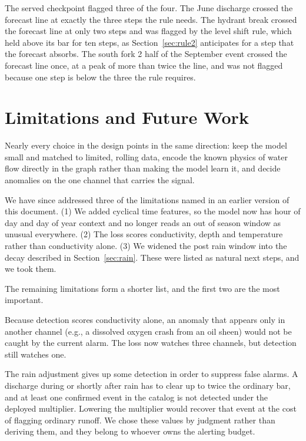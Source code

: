 \documentclass{article}
\begin{document}
The served checkpoint flagged three of the four. The June discharge crossed the
forecast line at exactly the three steps the rule needs. The hydrant break
crossed the forecast line at only two steps and was flagged by the level shift
rule, which held above its bar for ten steps, as Section~\ref{sec:rule2}
anticipates for a step that the forecast absorbs. The south fork 2 half of the
September event crossed the forecast line once, at a peak of more than twice
the line, and was not flagged because one step is below the three the rule
requires.

\section{Limitations and Future Work}
\label{sec:limitations}

Nearly every choice in the design points in the same direction: keep the model
small and matched to limited, rolling data, encode the known physics of water
flow directly in the graph rather than making the model learn it, and decide
anomalies on the one channel that carries the signal.

We have since addressed three of the limitations named in an earlier version
of this document. (1) We added cyclical time features, so the model now has
hour of day and day of year context and no longer reads an out of season window
as unusual everywhere. (2) The loss scores conductivity, depth and temperature
rather than conductivity alone. (3) We widened the post rain window into the
decay described in Section~\ref{sec:rain}. These were listed as natural next
steps, and we took them.

The remaining limitations form a shorter list, and the first two are the most
important.

Because detection scores conductivity alone, an anomaly that appears only in
another channel (e.g., a dissolved oxygen crash from an oil sheen) would not be
caught by the current alarm. The loss now watches three channels, but detection
still watches one.

The rain adjustment gives up some detection in order to suppress false alarms.
A discharge during or shortly after rain has to clear up to twice the ordinary
bar, and at least one confirmed event in the catalog is not detected under the
deployed multiplier. Lowering the multiplier would recover that event at the
cost of flagging ordinary runoff. We chose these values by judgment rather than
deriving them, and they belong to whoever owns the alerting budget.
\end{document}
